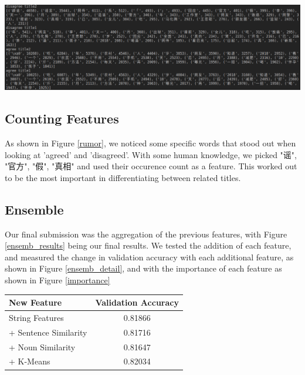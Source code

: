 \documentclass[a4paper, 12pt]{article}
\begin{document}
        \begin{center}
            \centering
            \includegraphics[width=\linewidth]{images/rumor_words.png}
            \label{rumor}
        \end{center}
    \begin{multicols}{2}

        \subsection{Counting Features}
            As shown in Figure \ref{rumor}, we noticed some specific words that stood out when looking at 'agreed' and 'disagreed'. With some human knowledge, we picked "谣", "官方", "假", "真相" and used their occurence count as a feature. This worked out to be the most important in differentiating between related titles.

        \subsection{Ensemble}
            Our final submission was the aggregation of the previous features, with Figure \ref{ensemb_results} being our final results. We tested the addition of each feature, and measured the change in validation accuracy with each additional feature, as shown in Figure \ref{ensemb_detail}, and with the importance of each feature as shown in Figure \ref{importance}

            \begin{center}
                \begin{tabular}{l|c}
                    New Feature & Validation Accuracy\\
                    \hline
                    String Features & 0.81866 \\
                    + Sentence Similarity & 0.81716 \\
                    + Noun Similarity & 0.81647 \\
                    + K-Means & 0.82034
                \end{tabular}
                \label{ensemb_detail}
            \end{center}


\end{multicols}
\end{document}
